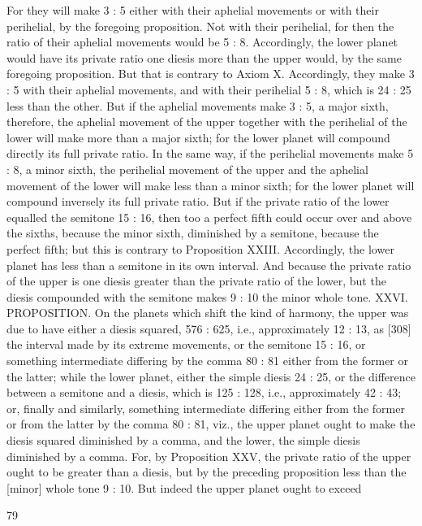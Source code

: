 \documentclass{article}
\begin{document}
For they will make 3 : 5 either with their aphelial movements or with
their perihelial, by the foregoing proposition. Not with their perihelial,
for then the ratio of their aphelial movements would be 5 : 8.
Accordingly, the lower planet would have its private ratio one diesis
more than the upper would, by the same foregoing proposition. But that
is contrary to Axiom X. Accordingly, they make 3 : 5 with their aphelial
movements, and with their perihelial 5 : 8, which is 24 : 25 less than the
other. But if the aphelial movements make 3 : 5, a major sixth, therefore,
the aphelial movement of the upper together with the perihelial of the
lower will make more than a major sixth; for the lower planet will
compound directly its full private ratio.
In the same way, if the perihelial movements make 5 : 8, a minor sixth,
the perihelial movement of the upper and the aphelial movement of the
lower will make less than a minor sixth; for the lower planet will
compound inversely its full private ratio. But if the private ratio of the
lower equalled the semitone 15 : 16, then too a perfect fifth could occur
over and above the sixths, because the minor sixth, diminished by a
semitone, because the perfect fifth; but this is contrary to Proposition
XXIII. Accordingly, the lower planet has less than a semitone in its own
interval. And because the private ratio of the upper is one diesis greater
than the private ratio of the lower, but the diesis compounded with the
semitone makes 9 : 10 the minor whole tone.
XXVI. PROPOSITION. On the planets which shift the kind of harmony,
the upper was due to have either a diesis squared, 576 : 625, i.e.,
approximately 12 : 13, as [308] the interval made by its extreme
movements, or the semitone 15 : 16, or something intermediate differing
by the comma 80 : 81 either from the former or the latter; while the
lower planet, either the simple diesis 24 : 25, or the difference between a
semitone and a diesis, which is 125 : 128, i.e., approximately 42 : 43; or,
finally and similarly, something intermediate differing either from the
former or from the latter by the comma 80 : 81, viz., the upper planet
ought to make the diesis squared diminished by a comma, and the lower,
the simple diesis diminished by a comma.
For, by Proposition XXV, the private ratio of the upper ought to be
greater than a diesis, but by the preceding proposition less than the
[minor] whole tone 9 : 10. But indeed the upper planet ought to exceed


79
\end{document}
